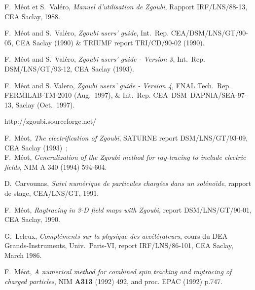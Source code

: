     


\pagestyle{myheadings}

\begin{thebibliography}{99}  %

F.~M\'eot et S.~Val\'ero, 
\textsl{Manuel d'utilisation de  Zgoubi}, 
Rapport IRF/LNS/88-13, CEA Saclay, 1988.  

F.~M\'eot and S.~Val\'ero, 
\textsl{Zgoubi users' guide}, 
Int.~Rep. CEA/DSM/LNS/GT/90-05, CEA Saclay (1990) \& TRIUMF report TRI/CD/90-02 (1990). 

F.~M\'eot and S.~Val\'ero, 
\textsl{Zgoubi users' guide - Version 3}, 
Int.~Rep. DSM/LNS/GT/93-12, CEA Saclay (1993). 

F.~M\'eot and S. Valero,  
\textsl{Zgoubi users' guide - Version 4}, 
FNAL Tech.~Rep. FERMILAB-TM-2010 (Aug.~1997),  \& 
Int.~Rep. CEA~DSM~DAPNIA/SEA-97-13, Saclay (Oct.~1997). 

 http://zgoubi.sourceforge.net/ 

F.~M\'eot, 
\textsl{The electrification of Zgoubi}, 
SATURNE report DSM/LNS/GT/93-09, CEA Saclay (1993)~; \\
F.~M\'eot, 
\textsl{Generalization of the Zgoubi method for ray-tracing to include electric fields}, 
NIM A 340 (1994) 594-604. 

D.~Carvounas, 
\textsl{Suivi num\'erique de particules charg\'ees dans un sol\'eno\"\i de}, 
rapport de stage, CEA/LNS/GT, 1991. 

F.~M\'eot, 
\textsl{Raytracing in 3-D field maps with Zgoubi}, 
report  DSM/LNS/GT/90-01, CEA Saclay, 1990.

G.~Leleux, 
\textsl{Compl\'ements sur la physique des acc\'el\'erateurs}, 
cours du DEA Grands-Instruments, Univ.~Paris-VI,  report  IRF/LNS/86-101, CEA Saclay, March 1986. 

F.~M\'eot, 
\textsl{A numerical method for combined spin tracking and raytracing of charged particles}, 
NIM \textbf{A313} (1992) 492, and proc. EPAC (1992) p.747. 


\end{thebibliography}
